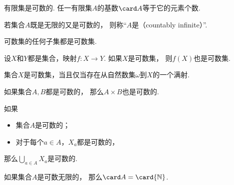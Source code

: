 \begin{proposition}
有限集是可数的.
任一有限集\(A\)的基数\(\card A\)等于它的元素个数.
\end{proposition}

\begin{definition}
若集合\(A\)既是无限的又是可数的，
则称“\(A\)是（countably infinite）”.
\end{definition}

\begin{proposition}
可数集的任何子集都是可数集.
\end{proposition}

\begin{proposition}
设\(X\)和\(Y\)都是集合，映射\(f\colon X\to Y\).
如果\(X\)是可数集，
则\(f(X)\)也是可数集.
\end{proposition}

\begin{proposition}
集合\(X\)是可数集，当且仅当存在从自然数集\(\omega\)到\(X\)的一个满射.
\end{proposition}

\begin{proposition}
如果集合\(A,B\)都是可数的，
那么\(A \times B\)也是可数的.
\end{proposition}

\begin{proposition}
如果\begin{itemize}
	\item 集合\(A\)是可数的；
	\item 对于每个\(a \in A\)，\(X_a\)都是可数的，
\end{itemize}
那么\(\bigcup_{a \in A} X_a\)是可数的.
\end{proposition}

\begin{proposition}
如果集合\(A\)是可数无限的，
那么\(\card A = \card{\mathbb{N}}\).
\end{proposition}

